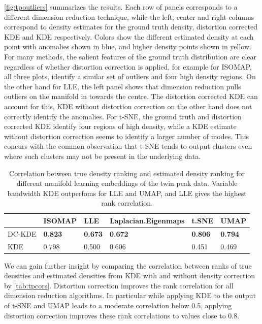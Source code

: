 \documentclass[11pt,a4paper,]{article}
\begin{document}
\autoref{fig:tpoutliers} summarizes the results. Each row of panels corresponds to a different dimension reduction technique, while the left, center and right columns correspond to density estimates for the ground truth density, distortion corrected KDE and KDE respectively. Colors show the different estimated density at each point with anomalies shown in blue, and higher density points shown in yellow. For many methods, the salient features of the ground truth distribution are clear regardless of whether distortion correction is applied, for example for ISOMAP, all three plots, identify a similar set of outliers and four high density regions. On the other hand for LLE, the left panel shows that dimension reduction pulls outliers on the manifold in towards the centre. The distortion corrected KDE can account for this, KDE without distortion correction on the other hand does not correctly identify the anomalies. For t-SNE, the ground truth and distortion corrected KDE identify four regions of high density, while a KDE estimate without distortion correction seems to identify a larger number of modes. This concurs with the common observation that t-SNE tends to output clusters even where such clusters may not be present in the underlying data.

\begin{table}

\caption{\label{tab:tpcors}Correlation between true density ranking and estimated density ranking for different manifold learning embeddings of the twin peak data. Variable bandwidth KDE outperfoms for LLE and UMAP, and LLE gives the highest rank correlation.}
\centering
\begin{tabular}[t]{l>{}l>{}l>{}l>{}l>{}l}
\toprule
  & ISOMAP & LLE & Laplacian.Eigenmaps & t.SNE & UMAP\\
\midrule
DC-KDE & \textbf{0.823} & \textbf{0.673} & \textbf{0.672} & \textbf{0.806} & \textbf{0.794}\\
KDE & 0.798 & 0.500 & 0.606 & 0.451 & 0.469\\
\bottomrule
\end{tabular}
\end{table}

We can gain further insight by comparing the correlation between ranks of true densities and estimated densities from KDE with and without density correction by \autoref{tab:tpcors}. Distortion correction improves the rank correlation for all dimension reduction algorithms. In particular while applying KDE to the output of t-SNE and UMAP leads to a moderate correlation below 0.5, applying distortion correction improves these rank correlations to values close to 0.8.
\end{document}
